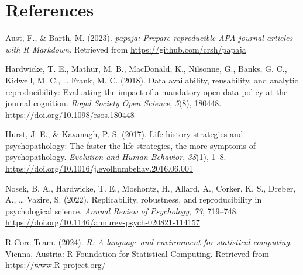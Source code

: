 \documentclass[
  english,
  man,floatsintext]{apa6}
\newlength{\cslhangindent}
\newenvironment{CSLReferences}[2] %
 {\begin{list}{}{%
  \setlength{\itemindent}{0pt}
  \setlength{\leftmargin}{0pt}
  \setlength{\parsep}{0pt}
  \ifodd #1
   \setlength{\leftmargin}{\cslhangindent}
   \setlength{\itemindent}{-1\cslhangindent}
  \fi
  \setlength{\itemsep}{#2\baselineskip}}}
 {\end{list}}
\begin{document}
\newpage

\section{References}\label{references}

\protect{}\label{refs}
\begin{CSLReferences}{1}{0}
Aust, F., \& Barth, M. (2023). \emph{{papaja}: {Prepare} reproducible {APA} journal articles with {R Markdown}}. Retrieved from \url{https://github.com/crsh/papaja}

Hardwicke, T. E., Mathur, M. B., MacDonald, K., Nilsonne, G., Banks, G. C., Kidwell, M. C., \ldots{} Frank, M. C. (2018). Data availability, reusability, and analytic reproducibility: Evaluating the impact of a mandatory open data policy at the journal cognition. \emph{Royal Society Open Science}, \emph{5}(8), 180448. \url{https://doi.org/10.1098/rsos.180448}

Hurst, J. E., \& Kavanagh, P. S. (2017). Life history strategies and psychopathology: The faster the life strategies, the more symptoms of psychopathology. \emph{Evolution and Human Behavior}, \emph{38}(1), 1--8. \url{https://doi.org/10.1016/j.evolhumbehav.2016.06.001}

Nosek, B. A., Hardwicke, T. E., Moshontz, H., Allard, A., Corker, K. S., Dreber, A., \ldots{} Vazire, S. (2022). Replicability, robustness, and reproducibility in psychological science. \emph{Annual Review of Psychology}, \emph{73}, 719--748. \url{https://doi.org/10.1146/annurev-psych-020821-114157}

R Core Team. (2024). \emph{R: A language and environment for statistical computing}. Vienna, Austria: R Foundation for Statistical Computing. Retrieved from \url{https://www.R-project.org/}

\end{CSLReferences}
\end{document}
